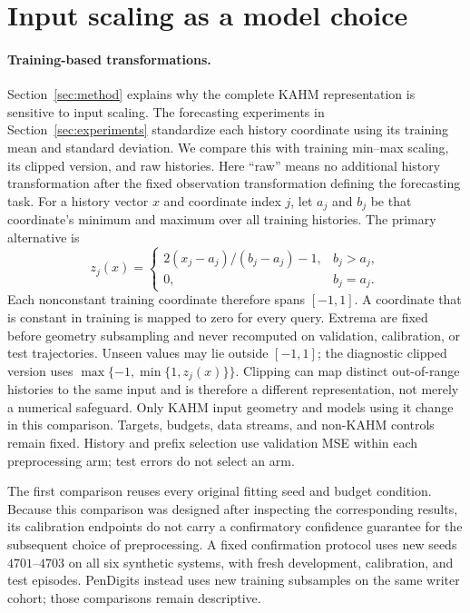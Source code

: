 \section{Input scaling as a model choice}
\label{sec:input-scaling}


\paragraph{Training-based transformations.}
Section~\ref{sec:method} explains why the complete KAHM representation is
sensitive to input scaling. The forecasting experiments in
Section~\ref{sec:experiments} standardize each history coordinate using its
training mean and standard deviation. We compare this with training
min--max scaling, its clipped version, and raw histories.
Here ``raw'' means no additional history transformation after the fixed
observation transformation defining the forecasting task. For a history vector
$x$ and coordinate index $j$, let $a_j$ and $b_j$ be that coordinate's minimum
and maximum over all training histories. The primary alternative is
\begin{equation}
 z_j(x)=\begin{cases}2(x_j-a_j)/(b_j-a_j)-1,&b_j>a_j,\\0,&b_j=a_j.\end{cases}
 \label{eq:input-minmax}
\end{equation}
Each nonconstant training coordinate therefore spans $[-1,1]$. A coordinate
that is constant in training is mapped to zero for every query. Extrema are
fixed before geometry subsampling and never recomputed on validation,
calibration, or test trajectories. Unseen values may lie outside $[-1,1]$;
the diagnostic clipped version uses $\max\{-1,\min\{1,z_j(x)\}\}$.
Clipping can map distinct out-of-range histories to the same input and is
therefore a different representation, not merely a numerical safeguard.
Only KAHM input geometry and models using it change in this comparison.
Targets, budgets, data streams, and non-KAHM controls remain fixed. History
and prefix selection use validation MSE within each preprocessing arm;
test errors do not select an arm.

The first comparison reuses every original fitting seed and budget condition.
Because this comparison was designed after inspecting the corresponding
results, its calibration endpoints do not carry a confirmatory confidence
guarantee for the subsequent choice of preprocessing. A fixed confirmation
protocol uses new seeds
$4701$--$4703$ on all six synthetic systems, with fresh development,
calibration, and test episodes. PenDigits instead uses new training subsamples
on the same writer cohort; those comparisons remain descriptive.

